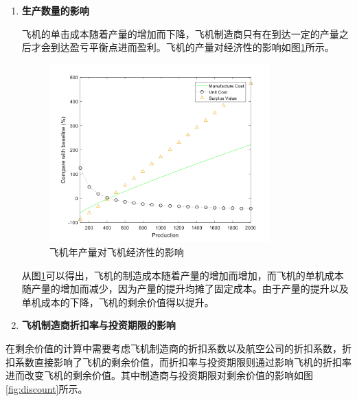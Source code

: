 \documentclass[12pt,a4paper]{report}
\begin{document}
\begin{enumerate}
\item \textbf{生产数量的影响}

飞机的单击成本随着产量的增加而下降，飞机制造商只有在到达一定的产量之后才会到达盈亏平衡点进而盈利。飞机的产量对经济性的影响如图\ref{fig:production}所示。

\begin{figure}[ht!]
	\centering
	\includegraphics[width=0.8\textwidth]{./media512/production.png}
	\caption{飞机年产量对飞机经济性的影响}
	\label{fig:production}
\end{figure}

从图\ref{fig:production}可以得出，飞机的制造成本随着产量的增加而增加，而飞机的单机成本随产量的增加而减少，因为产量的提升均摊了固定成本。由于产量的提升以及单机成本的下降，飞机的剩余价值得以提升。

\item \textbf{飞机制造商折扣率与投资期限的影响}
\end{enumerate}

在剩余价值的计算中需要考虑飞机制造商的折扣系数以及航空公司的折扣系数，折扣系数直接影响了飞机的剩余价值，而折扣率与投资期限则通过影响飞机的折扣率进而改变飞机的剩余价值。其中制造商与投资期限对剩余价值的影响如图\ref{fig:discount}所示。
\end{document}
